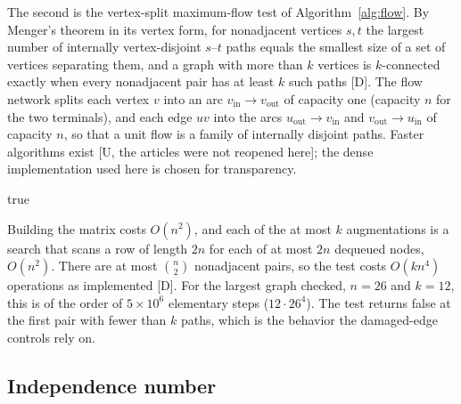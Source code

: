 The second is the vertex-split maximum-flow test of Algorithm~\ref{alg:flow}.
By Menger's theorem in its vertex form, for nonadjacent vertices $s,t$ the largest number of internally vertex-disjoint $s$--$t$ paths equals the smallest size of a set of vertices separating them, and a graph with more than $k$ vertices is $k$-connected exactly when every nonadjacent pair has at least $k$ such paths [D].
The flow network splits each vertex $v$ into an arc $v_{\mathrm{in}}\to v_{\mathrm{out}}$ of capacity one (capacity $n$ for the two terminals), and each edge $uv$ into the arcs $u_{\mathrm{out}}\to v_{\mathrm{in}}$ and $v_{\mathrm{out}}\to u_{\mathrm{in}}$ of capacity $n$, so that a unit flow is a family of internally disjoint paths.
Faster algorithms exist \cite{EvenTarjan,EsfahanianHakimi} [U, the articles were not reopened here]; the dense implementation used here is chosen for transparency.

\begin{algorithm}[t]
\caption{Vertex-split flow test of $\kappa(G)\ge k$ (EXP-001, \texttt{flow\_connectivity})}\label{alg:flow}
\Return true\;
\end{algorithm}

Building the matrix costs $O(n^2)$, and each of the at most $k$ augmentations is a search that scans a row of length $2n$ for each of at most $2n$ dequeued nodes, $O(n^2)$.
There are at most $\binom n2$ nonadjacent pairs, so the test costs $O(kn^4)$ operations as implemented [D].
For the largest graph checked, $n=26$ and $k=12$, this is of the order of $5\times10^6$ elementary steps ($12\cdot26^4$).
The test returns false at the first pair with fewer than $k$ paths, which is the behavior the damaged-edge controls rely on.

\subsection{Independence number}\label{sec:comp-alpha}

